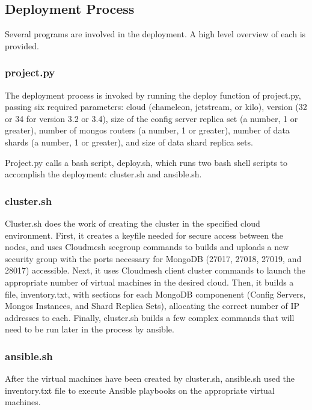 \documentclass[9pt,twocolumn,twoside]{../../styles/osajnl}
\begin{document}
\subsection{Deployment Process}

Several programs are involved in the deployment.  A high level overview of each is provided.

\subsubsection{project.py}

The deployment process is invoked by running the deploy function of project.py, passing six required parameters: cloud (chameleon, jetstream, or kilo), version (32 or 34 for version 3.2 or 3.4), size of the config server replica set (a number, 1 or greater), number of mongos routers (a number, 1 or greater), number of data shards (a number, 1 or greater), and size of data shard replica sets.

Project.py calls a bash script, deploy.sh, which runs two bash shell scripts to accomplish the deployment: cluster.sh and ansible.sh.

\subsubsection{cluster.sh}

Cluster.sh does the work of creating the cluster in the specified cloud environment.  First, it creates a keyfile needed for secure access between the nodes, and uses Cloudmesh secgroup commands to builds and uploads a new security group with the ports necessary for MongoDB (27017, 27018, 27019, and 28017) accessible.  Next, it uses Cloudmesh client cluster commands to launch the appropriate number of virtual machines in the desired cloud.  Then, it builds a file, inventory.txt, with sections for each MongoDB componenent (Config Servers, Mongos Instances, and Shard Replica Sets), allocating the correct number of IP addresses to each.  Finally, cluster.sh builds a few complex commands that will need to be run later in the process by ansible.

\subsubsection{ansible.sh}

After the virtual machines have been created by cluster.sh, ansible.sh used the inventory.txt file to execute Ansible playbooks on the appropriate virtual machines.
\end{document}
